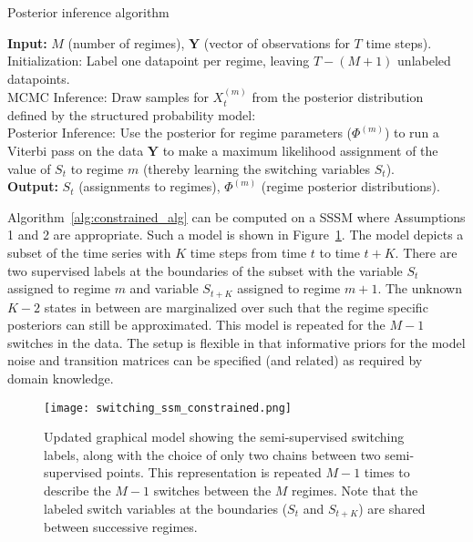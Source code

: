 \LinesNotNumbered
\begin{algorithm}
\caption{Posterior inference algorithm}\label{alg:constrained_alg}
\textbf{Input: } $M$ (number of regimes), $\mathbf{Y}$ (vector of observations for $T$ time steps).\\
\nextnr
Initialization: Label one datapoint per regime, leaving $T - (M+1)$ unlabeled datapoints.\\
\nextnr
MCMC Inference: Draw samples for $X_{t}^{(m)}$ from the posterior distribution defined by the structured probability model:\\
\nextnr
Posterior Inference: Use the posterior for regime parameters ($\Phi^{(m)}$) to run a Viterbi pass on the data $\mathbf{Y}$ to make a maximum likelihood assignment of the value of $S_t$ to regime $m$ (thereby learning the switching variables $S_t$).\\
\textbf{Output: } $S_t$ (assignments to regimes), $\Phi^{(m)}$ (regime posterior distributions).
\end{algorithm}

 Algorithm~\ref{alg:constrained_alg} can be computed on a SSSM where Assumptions 1 and 2 are appropriate. Such a model is shown in Figure~\ref{fig:updated_ssm_graphical_model}. The model depicts a subset of the time series with $K$ time steps from time $t$ to time $t+K$. There are two supervised labels at the boundaries of the subset with the variable $S_t$ assigned to regime $m$ and variable $S_{t+K}$ assigned to regime $m+1$. The unknown $K-2$ states in between are marginalized over such that the regime specific posteriors can still be approximated. This model is repeated for the $M-1$ switches in the data. The setup is flexible in that informative priors for the model noise and transition matrices can be specified (and related) as required by domain knowledge.

\begin{figure}
  \centering
  \texttt{[image: switching\_ssm\_constrained.png]}
  \caption{Updated graphical model showing the semi-supervised switching labels, along with the choice of only two chains between two semi-supervised points. This representation is repeated $M-1$ times to describe the $M-1$ switches between the $M$ regimes. Note that the labeled switch variables at the boundaries ($S_t$ and $S_{t+K}$) are shared between successive regimes.}
  \label{fig:updated_ssm_graphical_model}
\end{figure}
